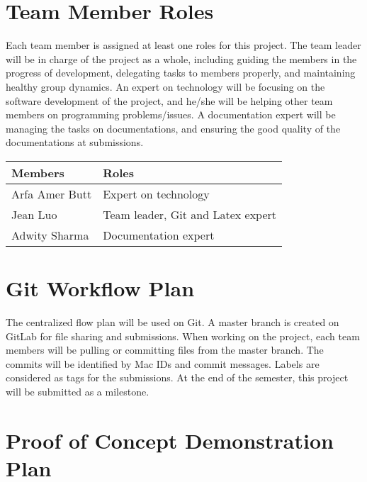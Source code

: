 \documentclass{article}
\begin{document}
\section  {Team Member Roles}

Each team member is assigned at least one roles for this project. The team leader will be in charge of the project as a whole, including guiding the members in the progress of development, delegating tasks to members properly, and maintaining healthy group dynamics. An expert on technology will be focusing on the software development of the project, and he/she will be helping other team members on programming problems/issues. A documentation expert will be managing the tasks on documentations, and ensuring the good quality of the documentations at submissions.\\

\begin{tabular}{|p{3cm}|p{8cm}|}
\hline
\textbf{Members}    & \textbf{Roles}                                                                                                                                                                                                                                                                                                                                                                                                                                \\\hline
Arfa Amer Butt       & Expert on technology \\\hline
Jean Luo   & Team leader, Git and Latex expert \\\hline
Adwity Sharma   & Documentation expert \\\hline
\end{tabular}

\section  { Git Workflow Plan}

The centralized flow plan will be used on Git. A master branch is created on GitLab for file sharing and submissions. When working on the project, each team members will be pulling or committing files from the master branch. The commits will be identified by Mac IDs and commit messages. Labels are considered as tags for the submissions. At the end of the semester, this project will be submitted as a milestone.\\

\section  {Proof of Concept Demonstration Plan}
\end{document}
